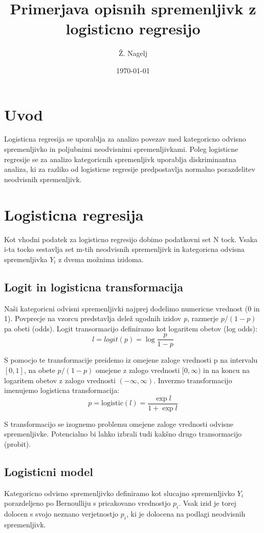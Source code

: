 \documentclass[letterpaper,11pt]{article}
\begin{document}



\title{\Large{Primerjava opisnih spremenljivk z logisticno regresijo}}
\author{Ž. Nagelj}
\date{\today}
\maketitle


\section{Uvod}
Logisticna regresija se uporablja za analizo povezav med kategoricno odvisno spremenljivko in poljubnimi neodvisnimi spremenljivkami. Poleg logisticne regresije se za analizo kategoricnih spremenljivk uporablja diskriminantna analiza, ki za razliko od logisticne regresije predpostavlja normalno porazdelitev neodvisnih spremenljivk.


\section{Logisticna regresija}
Kot vhodni podatek za logisticno regresijo dobimo podatkovni set N tock. Vsaka i-ta tocko sestavlja set m-tih neodvisnih spremenljivk in kategoricna odvisna spremenljivka $Y_i$ z dvema možnima izidoma.


\subsection{Logit in logisticna transformacija}
Naši kategoricni odvisni spremenljivki najprej dodelimo numericne vrednost (0 in 1). Povprecje na vzorcu predstavlja delež ugodnih izidov \emph{p}, razmerje $p/(1-p)$ pa obeti (odds). Logit transormacijo  definiramo kot logaritem obetov (log odds):
$$l = logit(p) = \log{\frac{p}{1-p}} $$

\noindent S pomocjo te transformacije preidemo iz omejene zaloge vrednosti p na intervalu $[0,1]$, na obete $p/(1-p)$ omejene z zalogo vrednosti $[0, \infty)$ in na koncu na logaritem obetov z zalogo vrednosti $(-\infty, \infty)$. Inverzno transformacijo imenujemo logisticna transformacija:
$$p = \text{logistic}(l)=\frac{\exp{l}}{1 + \exp{l}}$$

\noindent S transformacijo se izognemo problemu omejene zaloge vrednosti odvisne spremenljivke. Potencialno bi lahko izbrali tudi kakšno drugo transormacijo (probit).

\subsection{Logisticni model}
Kategoricno odvisno spremenljivko definiramo kot slucajno spremenljivko $Y_i$porazdeljeno po Bernoulliju s pricakovano vrednostjo $p_i$. Vsak izid je torej dolocen s svojo neznano verjetnostjo $p_i$, ki je dolocena na podlagi neodvisnih spremenljivk.
\newpage
\end{document}
